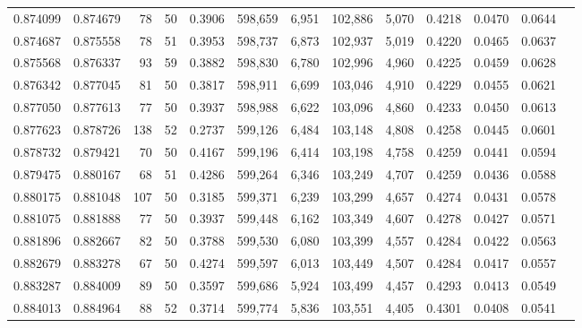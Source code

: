 \begin{tabular}{rrrrrrrrrrrrr}
0.874099 & 0.874679 &    78 &  50 &                                     0.3906 & 598,659 &   6,951 & 102,886 &   5,070 & 0.4218 & 0.0470 & 0.0644 \\
0.874687 & 0.875558 &    78 &  51 &                                     0.3953 & 598,737 &   6,873 & 102,937 &   5,019 & 0.4220 & 0.0465 & 0.0637 \\
0.875568 & 0.876337 &    93 &  59 &                                     0.3882 & 598,830 &   6,780 & 102,996 &   4,960 & 0.4225 & 0.0459 & 0.0628 \\
0.876342 & 0.877045 &    81 &  50 &                                     0.3817 & 598,911 &   6,699 & 103,046 &   4,910 & 0.4229 & 0.0455 & 0.0621 \\
0.877050 & 0.877613 &    77 &  50 &                                     0.3937 & 598,988 &   6,622 & 103,096 &   4,860 & 0.4233 & 0.0450 & 0.0613 \\
0.877623 & 0.878726 &   138 &  52 &                                     0.2737 & 599,126 &   6,484 & 103,148 &   4,808 & 0.4258 & 0.0445 & 0.0601 \\
0.878732 & 0.879421 &    70 &  50 &                                     0.4167 & 599,196 &   6,414 & 103,198 &   4,758 & 0.4259 & 0.0441 & 0.0594 \\
0.879475 & 0.880167 &    68 &  51 &                                     0.4286 & 599,264 &   6,346 & 103,249 &   4,707 & 0.4259 & 0.0436 & 0.0588 \\
0.880175 & 0.881048 &   107 &  50 &                                     0.3185 & 599,371 &   6,239 & 103,299 &   4,657 & 0.4274 & 0.0431 & 0.0578 \\
0.881075 & 0.881888 &    77 &  50 &                                     0.3937 & 599,448 &   6,162 & 103,349 &   4,607 & 0.4278 & 0.0427 & 0.0571 \\
0.881896 & 0.882667 &    82 &  50 &                                     0.3788 & 599,530 &   6,080 & 103,399 &   4,557 & 0.4284 & 0.0422 & 0.0563 \\
0.882679 & 0.883278 &    67 &  50 &                                     0.4274 & 599,597 &   6,013 & 103,449 &   4,507 & 0.4284 & 0.0417 & 0.0557 \\
0.883287 & 0.884009 &    89 &  50 &                                     0.3597 & 599,686 &   5,924 & 103,499 &   4,457 & 0.4293 & 0.0413 & 0.0549 \\
0.884013 & 0.884964 &    88 &  52 &                                     0.3714 & 599,774 &   5,836 & 103,551 &   4,405 & 0.4301 & 0.0408 & 0.0541 \\

\end{tabular}
